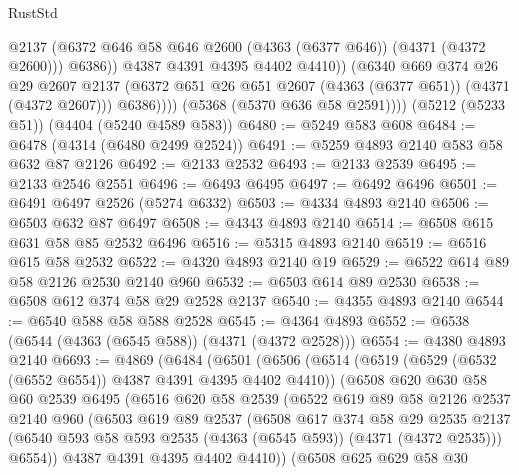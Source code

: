 \begin{lexlean}{RustStd}
\begin{coremodule}
                      @2137
                      (@6372 @646 @58 @646 @2600 (@4363 (@6377 @646)) (@4371 (@4372 @2600)))
                      @6386))
                  @4387
                  @4391
                  @4395
                  @4402
                  @4410))
              (@6340
                @669
                @374
                @26
                @29
                @2607
                @2137
                (@6372 @651 @26 @651 @2607 (@4363 (@6377 @651)) (@4371 (@4372 @2607)))
                @6386))))
        (@5368 (@5370 @636 @58 @2591))))
    (@5212 (@5233 @51))
    (@4404 (@5240 @4589 @583))
@6480 := @5249 @583 @608
@6484 := @6478 (@4314 (@6480 @2499 @2524))
@6491 := @5259 @4893 @2140 @583 @58 @632 @87 @2126
@6492 := @2133 @2532
@6493 := @2133 @2539
@6495 := @2133 @2546 @2551
@6496 := @6493 @6495
@6497 := @6492 @6496
@6501 := @6491 @6497 @2526 (@5274 @6332)
@6503 := @4334 @4893 @2140
@6506 := @6503 @632 @87 @6497
@6508 := @4343 @4893 @2140
@6514 := @6508 @615 @631 @58 @85 @2532 @6496
@6516 := @5315 @4893 @2140
@6519 := @6516 @615 @58 @2532
@6522 := @4320 @4893 @2140 @19
@6529 := @6522 @614 @89 @58 @2126 @2530 @2140 @960
@6532 := @6503 @614 @89 @2530
@6538 := @6508 @612 @374 @58 @29 @2528 @2137
@6540 := @4355 @4893 @2140
@6544 := @6540 @588 @58 @588 @2528
@6545 := @4364 @4893
@6552 := @6538 (@6544 (@4363 (@6545 @588)) (@4371 (@4372 @2528)))
@6554 := @4380 @4893 @2140
@6693 := @4869
    (@6484
      (@6501
        (@6506
          (@6514
            (@6519 (@6529 (@6532 (@6552 @6554)) @4387 @4391 @4395 @4402 @4410))
            (@6508
              @620
              @630
              @58
              @60
              @2539
              @6495
              (@6516
                @620
                @58
                @2539
                (@6522
                  @619
                  @89
                  @58
                  @2126
                  @2537
                  @2140
                  @960
                  (@6503
                    @619
                    @89
                    @2537
                    (@6508
                      @617
                      @374
                      @58
                      @29
                      @2535
                      @2137
                      (@6540 @593 @58 @593 @2535 (@4363 (@6545 @593)) (@4371 (@4372 @2535)))
                      @6554))
                  @4387
                  @4391
                  @4395
                  @4402
                  @4410))
              (@6508
                @625
                @629
                @58
                @30

\end{coremodule}
\end{lexlean}
